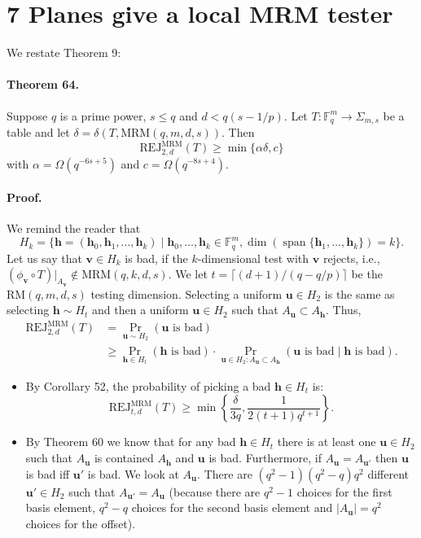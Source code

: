 \documentclass[10pt,a4paper]{article}
\begin{document}
\section*{7 Planes give a local MRM tester}
We restate Theorem 9:

\paragraph{Theorem 64.} Suppose $q$ is a prime power, $s\leq q$ and $d<q(s-1/p)$. Let $T:\mathbb F_q^m\to\Sigma_{m,s}$ be a table and let $\delta=\delta(T,\mathrm{MRM}(q,m,d,s))$. Then
\[\mathrm{REJ}_{2,d}^{\mathrm{MRM}}(T)\geq\min\{\alpha\delta,c\}\]
with $\alpha=\Omega(q^{-6s+5})$ and $c=\Omega(q^{-8s+4})$.

\paragraph{Proof.} We remind the reader that
\[H_k=\{\boldsymbol h=(\boldsymbol h_0,\boldsymbol h_1,\ldots,\boldsymbol h_k)\mid\boldsymbol h_0,\ldots,\boldsymbol h_k\in\mathbb F_q^m,\dim(\operatorname{span}\{\boldsymbol h_1,\ldots,\boldsymbol h_k\})=k\}.\]
Let us say that $\boldsymbol v\in H_k$ is bad, if the $k$-dimensional test with $\boldsymbol v$ rejects, i.e., $(\phi_{\boldsymbol v}\circ T)|_{A_{\boldsymbol v}}\notin\mathrm{MRM}(q,k,d,s)$. We let $t=\lceil(d+1)/(q-q/p)\rceil$ be the $\mathrm{RM}(q,m,d,s)$ testing dimension. Selecting a uniform $\boldsymbol u\in H_2$ is the same as selecting $\boldsymbol h\sim H_t$ and then a uniform $\boldsymbol u\in H_2$ such that $A_{\boldsymbol u}\subset A_{\boldsymbol h}$. Thus,
\begin{align*}
\mathrm{REJ}_{2,d}^{\mathrm{MRM}}(T)&=\Pr_{\boldsymbol u\sim H_2}(\boldsymbol u\text{ is bad})\\
&\geq\Pr_{\boldsymbol h\in H_t}(\boldsymbol h\text{ is bad})\cdot\Pr_{\boldsymbol u\in H_2:A_{\boldsymbol u}\subset A_{\boldsymbol h}}(\boldsymbol u\text{ is bad}\mid\boldsymbol h\text{ is bad}).
\end{align*}
\begin{itemize}
\item By Corollary 52, the probability of picking a bad $\boldsymbol h\in H_t$ is:
\[\mathrm{REJ}_{t,d}^{\mathrm{MRM}}(T)\geq\min\left\{\frac\delta{3q},\frac1{2(t+1)q^{t+1}}\right\}.\]
\item By Theorem 60 we know that for any bad $\boldsymbol h\in H_t$ there is at least one $\boldsymbol u\in H_2$ such that $A_{\boldsymbol u}$ is contained $A_{\boldsymbol h}$ and $\boldsymbol u$ is bad. Furthermore, if $A_{\boldsymbol u}=A_{\boldsymbol u'}$ then $\boldsymbol u$ is bad iff $\boldsymbol u'$ is bad. We look at $A_{\boldsymbol u}$. There are $(q^2-1)(q^2-q)q^2$ different $\boldsymbol u'\in H_2$ such that $A_{\boldsymbol u'}=A_{\boldsymbol u}$ (because there are $q^2-1$ choices for the first basis element, $q^2-q$ choices for the second basis element and $|A_{\boldsymbol u}|=q^2$ choices for the offset).
\end{itemize}
\end{document}
